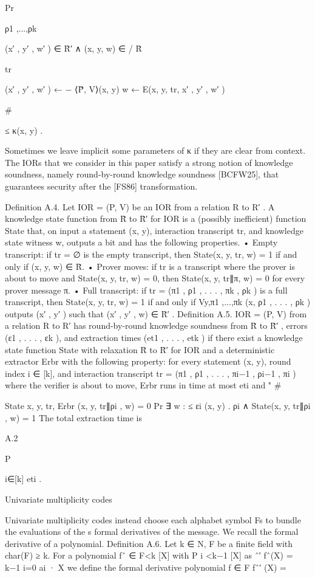 \documentclass[11pt]{article}
\begin{document}
Pr

ρ1 ,...,ρk

(x′ , y′ , w′ ) ∈ R̃′
∧ (x, y, w) ∈
/ R̃

tr

(x′ , y′ , w′ ) ←
− ⟨P̃, V⟩(x, y)
w ← E(x, y, tr, x′ , y′ , w′ )

\#

≤ κ(x, y) .

Sometimes we leave implicit some parameters of κ if they are clear from context.
The IORs that we consider in this paper satisfy a strong notion of knowledge soundness, namely
round-by-round knowledge soundness [BCFW25], that guarantees security after the [FS86] transformation.

Definition A.4. Let IOR = (P, V) be an IOR from a relation R to R′ . A knowledge state
function from R̃ to R̃′ for IOR is a (possibly inefficient) function State that, on input a statement
(x, y), interaction transcript tr, and knowledge state witness w, outputs a bit and has the
following properties.
• Empty transcript: if tr = ∅ is the empty transcript, then State(x, y, tr, w) = 1 if and only if
(x, y, w) ∈ R̃.
• Prover moves: if tr is a transcript where the prover is about to move and State(x, y, tr, w) = 0,
then State(x, y, tr∥π, w) = 0 for every prover message π.
• Full transcript: if tr = (π1 , ρ1 , . . . , πk , ρk ) is a full transcript, then State(x, y, tr, w) = 1 if and
only if Vy,π1 ,...,πk (x, ρ1 , . . . , ρk ) outputs (x′ , y′ ) such that (x′ , y′ , w) ∈ R̃′ .
Definition A.5. IOR = (P, V) from a relation R to R′ has round-by-round knowledge soundness from R̃ to R̃′ , errors (ε1 , . . . , εk ), and extraction times (et1 , . . . , etk ) if there exist a
knowledge state function State with relaxation R̃ to R̃′ for IOR and a deterministic extractor Erbr
with the following property: for every statement (x, y), round index i ∈ [k], and interaction transcript tr = (π1 , ρ1 , . . . , πi−1 , ρi−1 , πi ) where the verifier is about to move, Erbr runs in time at most
eti and
"
\#

State x, y, tr, Erbr (x, y, tr∥ρi , w) = 0
Pr ∃ w :
≤ εi (x, y) .
ρi
∧ State(x, y, tr∥ρi , w) = 1
The total extraction time is

A.2

P

i∈[k] eti .

Univariate multiplicity codes

Univariate multiplicity codes instead choose each alphabet symbol Fs to bundle the evaluations of
the s formal derivatives of the message. We recall the formal derivative of a polynomial.
Definition A.6. Let k ∈ N, F be a finite field with char(F) ≥ k. For a polynomial fˆ ∈ F<k [X] with
P
i
<k−1 [X] as
ˆ′
fˆ(X) = k−1
i=0 ai · X we define the formal derivative polynomial f ∈ F
fˆ′ (X) =
\end{document}
